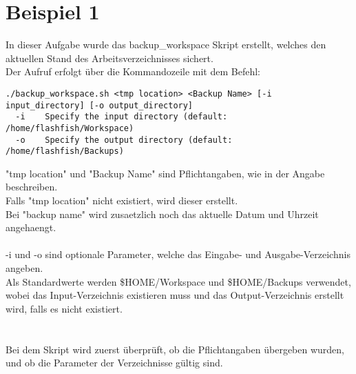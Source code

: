 \documentclass{report}
\newcommand{\name}{Marco Söllinger}
\newcommand{\matnr}{s2410306011}
\newcommand{\uebungsgruppe}{Gruppe 1}
\newcommand{\aufwand}{2}
\begin{document}



\section*{Beispiel 1}
In dieser Aufgabe wurde das backup\_workspace Skript erstellt, welches den aktuellen Stand des Arbeitsverzeichnisses sichert.\\
Der Aufruf erfolgt über die Kommandozeile mit dem Befehl:\\
\begin{lstlisting}[style=cppstyle, title=\texttt{Terminal Output}]
./backup_workspace.sh <tmp location> <Backup Name> [-i input_directory] [-o output_directory]
  -i    Specify the input directory (default: /home/flashfish/Workspace)
  -o    Specify the output directory (default: /home/flashfish/Backups)
\end{lstlisting}
"tmp location" und "Backup Name" sind Pflichtangaben, wie in der Angabe beschreiben.\\
Falls "tmp location" nicht existiert, wird dieser erstellt.\\
Bei "backup name" wird zusaetzlich noch das aktuelle Datum und Uhrzeit angehaengt.\\\\
-i und -o sind optionale Parameter, welche das Eingabe- und Ausgabe-Verzeichnis angeben.\\
Als Standardwerte werden \$HOME/Workspace und \$HOME/Backups verwendet, wobei das Input-Verzeichnis existieren muss und das Output-Verzeichnis erstellt wird, falls es nicht existiert.\\\\\\
Bei dem Skript wird zuerst überprüft, ob die Pflichtangaben übergeben wurden, und ob die Parameter der Verzeichnisse gültig sind.\\
\end{document}
